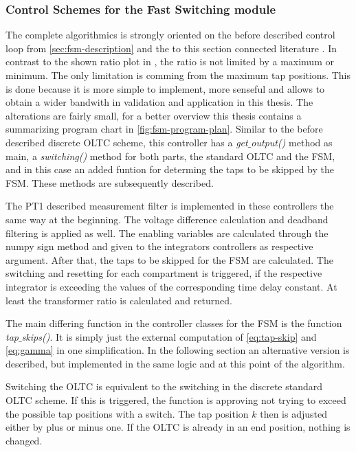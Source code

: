 \subsubsection{Control Schemes for the Fast Switching module}

The complete algorithmics is strongly oriented on the before described control loop from \autoref{sec:fsm-description} and the to this section connected literature \autocite{burlakin_2024,burlakin_2024a,maschinenfabrikreinhausengmbh_2023}.
In contrast to the shown ratio plot in \textcite{burlakin_2024}, the ratio is not limited by a maximum or minimum.
The only limitation is comming from the maximum tap positions.
This is done because it is more simple to implement, more senseful and allows to obtain a wider bandwith in validation and application in this thesis.
The alterations are fairly small, for a better overview this thesis contains a summarizing program chart in \autoref{fig:fsm-program-plan}.
Similar to the before described discrete \acs{OLTC} scheme, this controller has a \textit{get$\_$output()} method as main, a \textit{switching()} method for both parts, the standard \acs{OLTC} and the \acs{FSM}, and in this case an added funtion for determing the taps to be skipped by the \acs{FSM}.
These methods are subsequently described.

The PT1 described measurement filter is implemented in these controllers the same way at the beginning.
The voltage difference calculation and deadband filtering is applied as well.
The enabling variables are calculated through the numpy sign method and given to the integrators controllers as respective argument.
After that, the taps to be skipped for the \acs{FSM} are calculated.
The switching and resetting for each compartment is triggered, if the respective integrator is exceeding the values of the corresponding time delay constant.
At least the transformer ratio is calculated and returned.

The main differing function in the controller classes for the \acs{FSM} is the function \textit{tap$\_$skips()}.
It is simply just the external computation of \autoref{eq:tap-skip} and \autoref{eq:gamma} in one simplification.
In the following section an alternative version is described, but implemented in the same logic and at this point of the algorithm.

Switching the \acs{OLTC} is equivalent to the switching in the discrete standard \acs{OLTC} scheme.
If this is triggered, the function is approving not trying to exceed the possible tap positions with a switch.
The tap position $k$ then is adjusted either by plus or minus one.
If the \acs{OLTC} is already in an end position, nothing is changed.

